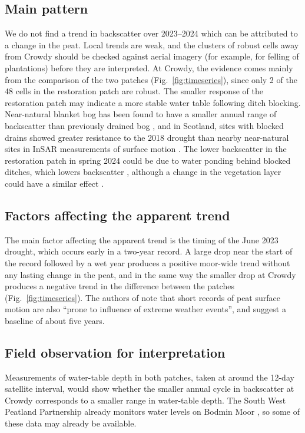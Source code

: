 \documentclass[10pt,a4paper,twocolumn]{article}
\begin{document}
\subsection{Main pattern}
We do not find a trend in backscatter over 2023--2024 which can be attributed to a change in the peat.
Local trends are weak, and the clusters of robust cells away from Crowdy should be checked against aerial imagery (for example, for felling of plantations) before they are interpreted.
At Crowdy, the evidence comes mainly from the comparison of the two patches (Fig.~\ref{fig:timeseries}), since only 2 of the 48 cells in the restoration patch are robust.
The smaller response of the restoration patch may indicate a more stable water table following ditch blocking.
Near-natural blanket bog has been found to have a smaller annual range of backscatter than previously drained bog \cite{toca2023potential}, and in Scotland, sites with blocked drains showed greater resistance to the 2018 drought than nearby near-natural sites in InSAR measurements of surface motion \cite{marshall2021naturescot}.
The lower backscatter in the restoration patch in spring 2024 could be due to water ponding behind blocked ditches, which lowers backscatter \cite{asmuss2019potential}, although a change in the vegetation layer could have a similar effect \cite{hrysiewicz2023sar}.

\subsection{Factors affecting the apparent trend}
\label{sec:factor}
The main factor affecting the apparent trend is the timing of the June 2023 drought, which occurs early in a two-year record.
A large drop near the start of the record followed by a wet year produces a positive moor-wide trend without any lasting change in the peat, and in the same way the smaller drop at Crowdy produces a negative trend in the difference between the patches (Fig.~\ref{fig:timeseries}).
The authors of \cite{marshall2021naturescot} note that short records of peat surface motion are also ``prone to influence of extreme weather events'', and suggest a baseline of about five years.

\subsection{Field observation for interpretation}
Measurements of water-table depth in both patches, taken at around the 12-day satellite interval, would show whether the smaller annual cycle in backscatter at Crowdy corresponds to a smaller range in water-table depth.
The South West Peatland Partnership already monitors water levels on Bodmin Moor \cite{swpp}, so some of these data may already be available.
\end{document}
